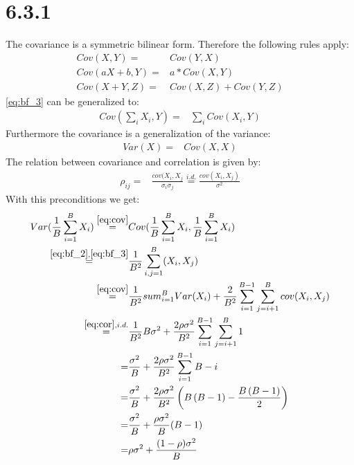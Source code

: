 \documentclass[a4paper,11pt]{article}
\theoremstyle{definition}
\theoremstyle{plain}
\theoremstyle{remark}
\begin{document}
\section*{6.3.1}
The covariance is a symmetric bilinear form. Therefore the following rules apply:
\begin{align}
Cov(X,Y) =& Cov(Y,X) \label{eq:bf_1} \\
Cov(aX+b,Y) =& a*Cov(X,Y) \label{eq:bf_2} \\
Cov(X+Y,Z) =& Cov(X,Z)+Cov(Y,Z) \label{eq:bf_3}
\end{align}
\ref{eq:bf_3} can be generalized to:
\begin{align}
Cov(\sum_iX_i, Y) =& \sum_iCov(X_i,Y) \label{eq:bf_4}
\end{align}
Furthermore the covariance is a generalization of the variance:
\begin{align}
Var(X) =& Cov(X,X) \label{eq:cov}
\end{align}
The relation between covariance and correlation is given by:
\begin{align}
\rho_{ij} =& \frac{cov(X_i,X_j}{\sigma_i\sigma_j} \overset{i.d.}{=} \frac{cov(X_i,X_j)}{\sigma^2} \label{eq:cor}
\end{align}
With this preconditions we get:
\begin{align}
Var(\frac{1}{B}\sum_{i=1}^BX_i) \overset{\ref{eq:cov}}{=}& Cov(\frac{1}{B}\sum_{i=1}^BX_i,\frac{1}{B}\sum_{i=1}^BX_i) \\
  \overset{\ref{eq:bf_2}, \ref{eq:bf_3}}{=}&\frac{1}{B^2}\sum_{i,j=1}^B(X_i,X_j) \\
  \overset{\ref{eq:cov}}{=}&\frac{1}{B^2}sum_{i=1}^BVar(X_i)+\frac{2}{B^2}\sum_{i=1}^{B-1}\sum_{j=i+1}^Bcov(X_i,X_j) \\
  \overset{\ref{eq:cor}, i.d.}{=}&\frac{1}{B^2}B\sigma^2+\frac{2\rho\sigma^2}{B^2}\sum_{i=1}^{B-1}\sum_{j=i+1}^B1 \\
  =&\frac{\sigma^2}{B}+\frac{2\rho\sigma^2}{B^2}\sum_{i=1}^{B-1}B-i \\
  =&\frac{\sigma^2}{B}+\frac{2\rho\sigma^2}{B^2}\left(B\left(B-1\right) - \frac{B\left(B-1\right)}{2}\right) \\
  =&\frac{\sigma^2}{B}+\frac{\rho\sigma^2}{B}(B-1) \\
  =&\rho\sigma^2+\frac{(1-\rho)\sigma^2}{B}
\end{align} 
\end{document}
